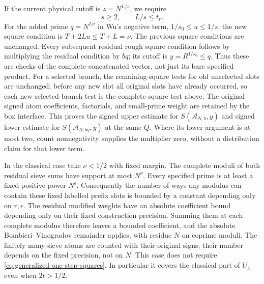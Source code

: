If the current physical cutoff is $z=N^{L/s}$, we require
\begin{equation}\label{eq:generalized-one-step-cutoff}
 s\ge2,\qquad L/s\le t_r.
\end{equation}
For the added prime $q=N^{Lu}$ in Wu's negative term,
$1/s_0\le u\le1/s$, the new square condition is
$T+2Lu\le T+L=\nu$. The previous square conditions are unchanged.
Every subsequent residual rough square condition follows by
multiplying the residual condition by $bq$; its cutoff is
$y=R^{1/s_0}\le q$. Thus these are checks of the complete concatenated
vector, not just its bare specified product. For a selected branch,
the remaining-square tests for old unselected slots are unchanged;
before any new slot all original slots have already occurred, so
each new selected-branch test is the complete square test above.
The original signed atom coefficients, factorials, and small-prime
weight are retained by the box interface. This proves the signed
upper estimate for $S(\mathcal A_{N,b},y)$ and signed lower estimate
for $S(\mathcal A_{N,bq},y)$ at the same $Q$.
Where its lower argument is at most two, count nonnegativity supplies
the multiplier zero, without a distribution claim for that lower term.

In the classical case take $\nu<1/2$ with fixed margin. The complete
moduli of both residual sieve sums have support at most $N^\nu$.
Every specified prime is at least a fixed positive power $N^\epsilon$.
Consequently the number of ways any modulus can contain these fixed
labelled prefix slots is bounded by a constant depending only on
$r,\epsilon$. The residual modified weights have an absolute
coefficient bound depending only on their fixed construction
precision. Summing them at each complete modulus therefore leaves a
bounded coefficient, and the absolute Bombieri--Vinogradov remainder
applies, with residue $N$ on coprime moduli. The finitely many sieve
atoms are counted with their original signs; their number depends on
the fixed precision, not on $N$. This case does not require
\eqref{eq:generalized-one-step-squares}. In particular it covers the
classical part of $U_3$ even when $2t>1/2$.

